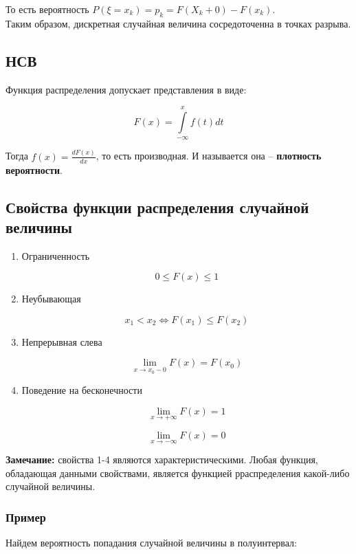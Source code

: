 \documentclass{article}
\begin{document}
То есть вероятность $P(\xi = x_k) = p_k = F(X_k + 0) - F(x_k)$.
\\

Таким образом, дискретная случайная величина сосредоточенна в точках разрыва.

\subsection{НСВ}

Функция распределения допускает представления в виде:

$$ F(x) = \int\limits_{-\infty}^{x} f(t)dt$$

Тогда $f(x) = \frac{dF(x)}{dx}$, то есть производная. И называется она -- \textbf{плотность вероятности}.

\subsection{Свойства функции распределения случайной величины}

\begin{enumerate}
\item Ограниченность

$$0 \leq F(x) \leq 1$$

\item Неубывающая

$$x_1 < x_2 \Leftrightarrow F(x_1) \leq F(x_2)$$

\item Непрерывная слева

$$\lim\limits_{x \rightarrow x_0 - 0} F(x) = F(x_0)$$

\item Поведение на бесконечности

$$ \lim\limits_{x \rightarrow +\infty} F(x) = 1$$

$$ \lim\limits_{x \rightarrow -\infty} F(x) = 0$$

\end{enumerate}


\textbf{Замечание:} свойства 1-4 являются характеристическими. Любая функция, обладающая данными свойствами, является функцией рраспределения какой-либо случайной величины.

\subsubsection{Пример}

Найдем вероятность попадания случайной величины в полуинтервал:
\end{document}
